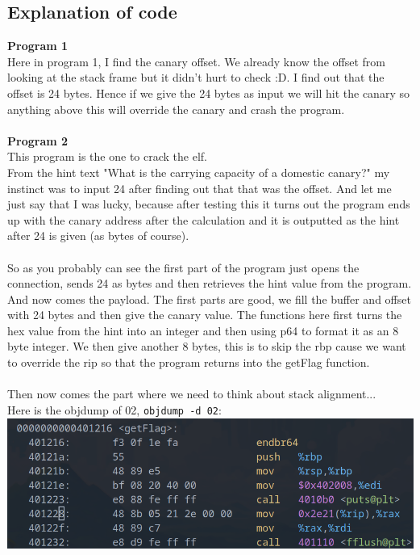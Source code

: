 \documentclass{article}
\begin{document}
\subsection{Explanation of code}
\textbf{Program 1}\\
Here in program 1, I find the canary offset. We already know the offset from looking at the stack frame but it didn't hurt to check :D. I find out that the offset is 24 bytes. Hence if we give the 24 bytes as input we will hit the canary so anything above this will override the canary and crash the program.
\\ \\
\textbf{Program 2} \\
This program is the one to crack the elf.\\
From the hint text "What is the carrying capacity of a domestic canary?" my instinct was to input 24 after finding out that that was the offset. And let me just say that I was lucky, because after testing this it turns out the program ends up with the canary address after the calculation and it is outputted as the hint after 24 is given (as bytes of course). 
\\ \\
So as you probably can see the first part of the program just opens the connection, sends 24 as bytes and then retrieves the hint value from the program. And now comes the payload. The first parts are good, we fill the buffer and offset with 24 bytes and then give the canary value. The functions here first turns the hex value from the hint into an integer and then using p64 to format it as an 8 byte integer. We then give another 8 bytes, this is to skip the rbp cause we want to override the rip so that the program returns into the getFlag function.
\\ \\
Then now comes the part where we need to think about stack alignment... \\
Here is the objdump of 02, \lstinline{objdump -d 02}: \\
\includegraphics[scale=0.5]{objdump-02.png} \\
\end{document}
